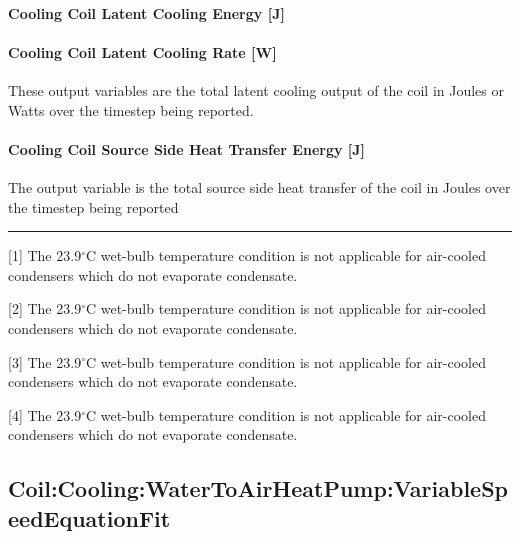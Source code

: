 \paragraph{Cooling Coil Latent Cooling Energy {[}J{]}}\label{cooling-coil-latent-cooling-energy-j-6}

\paragraph{Cooling Coil Latent Cooling Rate {[}W{]}}\label{cooling-coil-latent-cooling-rate-w-4}

These output variables are the total latent cooling output of the coil in Joules or Watts over the timestep being reported.

\paragraph{Cooling Coil Source Side Heat Transfer Energy {[}J{]}}\label{cooling-coil-source-side-heat-transfer-energy-j-3}

The output variable is the total source side heat transfer of the coil in Joules over the timestep being reported

\begin{center}\rule{0.5\linewidth}{0.4pt}\end{center}

{[}1{]} The 23.9$^\circ$C wet-bulb temperature condition is not applicable for air-cooled condensers which do not evaporate condensate.

{[}2{]} The 23.9$^\circ$C wet-bulb temperature condition is not applicable for air-cooled condensers which do not evaporate condensate.

{[}3{]} The 23.9$^\circ$C wet-bulb temperature condition is not applicable for air-cooled condensers which do not evaporate condensate.

{[}4{]} The 23.9$^\circ$C wet-bulb temperature condition is not applicable for air-cooled condensers which do not evaporate condensate.

\subsection{Coil:Cooling:WaterToAirHeatPump:VariableSpeedEquationFit}\label{coilcoolingwatertoairheatpumpvariablespeedequationfit}

